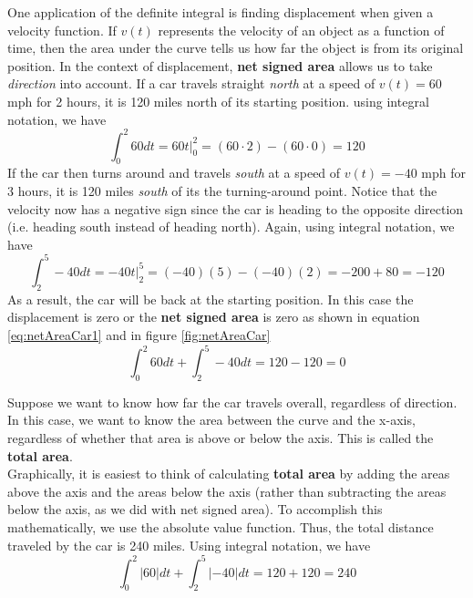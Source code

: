 \noindent One application of the definite integral is finding displacement when given a velocity function. If $v(t)$ represents the velocity of an object as a function of time, then the area under the curve tells us how far the object is from its original position. In the context of displacement, \textbf{net signed area} allows us to take \emph{direction} into account. If a car travels straight \emph{north} at a speed of $v(t)=60$ mph for 2 hours, it is 120 miles north of its starting position. using integral notation, we have 
\begin{equation}
    \int_0^2 60 dt=60t\big|_{0}^{2}=(60\cdot 2)-(60\cdot 0)=120
\end{equation}
\noindent If the car then turns around and travels \emph{south} at a speed of $v(t)=-40$ mph for 3 hours, it is 120 miles \emph{south} of its the turning-around point. Notice that the velocity now has a negative sign since the car is heading to the opposite direction (i.e. heading south instead of heading north). Again, using integral notation, we have
\begin{equation}
    \int_2^5 -40 dt=-40t\big|_{2}^{5}=(-40)(5)-(-40)(2)=-200+80=-120
\end{equation}
\noindent As a result, the car will be back at the starting position. In this case the displacement is zero or the \textbf{net signed area} is zero as shown in equation \ref{eq:netAreaCar1} and in figure \ref{fig:netAreaCar}
\begin{equation}\label{eq:netAreaCar1}
  \int_0^2 60 dt+\int_2^5 -40 dt=120-120=0
\end{equation}

\noindent Suppose we want to know how far the car travels overall, regardless of direction. In this case, we want to know the area
between the curve and the x-axis, regardless of whether that area is above or below the axis. This is called the \textbf{total area}.\\

\noindent Graphically, it is easiest to think of calculating \textbf{total area} by adding the areas above the axis and the areas below the axis
(rather than subtracting the areas below the axis, as we did with net signed area). To accomplish this mathematically, we use
the absolute value function. Thus, the total distance traveled by the car is 240 miles. Using integral notation, we have
\begin{equation}\label{eq:netAreaCar2}
    \int_0^2 |60| dt+\int_2^5 |-40| dt=120+120=240
\end{equation}

